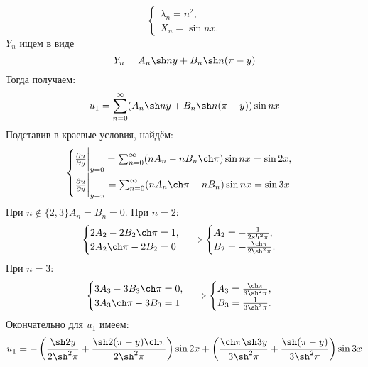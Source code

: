 \documentclass[11pt]{article}
\begin{document}
\begin{equation*}
\begin{cases}
\lambda_n = n^2, \\
X_n = \sin nx.
\end{cases}
\end{equation*}
$Y_n$ ищем в виде
\begin{equation*}
Y_n = A_n\sh ny + B_n\sh n(\pi - y)
\end{equation*}
Тогда получаем:
\begin{equation*}
u_1 = \sum_{n = 0}^{\infty}(A_n\sh ny + B_n\sh n(\pi - y))\sin nx
\end{equation*}
Подставив в краевые условия, найдём:
\begin{equation*}
\begin{cases}
\frac{\partial u}{\partial y}\bigg|_{y = 0} = \sum_{n = 0}^{\infty}(nA_n - nB_n\ch\pi)\sin nx = \sin 2x, \\
\frac{\partial u}{\partial y}\bigg|_{y = \pi} = \sum_{n = 0}^{\infty}(nA_n\ch\pi - nB_n)\sin nx = \sin 3x.
\end{cases}
\end{equation*}
При $n \notin \{2, 3\} A_n = B_n = 0$. При $n = 2$:
\begin{equation*}
\begin{cases}
2A_2 - 2B_2\ch\pi = 1, \\
2A_2\ch\pi - 2B_2 = 0
\end{cases}
\Rightarrow
\begin{cases}
A_2 = -\frac1{2sh^2\pi}, \\
B_2 = -\frac{\ch\pi}{2\sh^2\pi}.
\end{cases}
\end{equation*}
При $n = 3$:
\begin{equation*}
\begin{cases}
3A_3 - 3B_3\ch\pi = 0, \\
3A_3\ch\pi - 3B_3 = 1
\end{cases}
\Rightarrow
\begin{cases}
A_3 = \frac{\ch\pi}{3\sh^2\pi}, \\
B_3 = \frac{1}{3\sh^2\pi}.
\end{cases}
\end{equation*}
Окончательно для $u_1$ имеем:
\begin{equation}
u_1 = -\left(\frac{\sh2y}{2\sh^2\pi} + \frac{\sh2(\pi - y)\ch\pi}{2\sh^2\pi}\right)\sin2x +
\left(\frac{\ch\pi\sh3y}{3\sh^2\pi} + \frac{\sh(\pi - y)}{3\sh^2\pi}\right)\sin3x
\end{equation}
\end{document}
